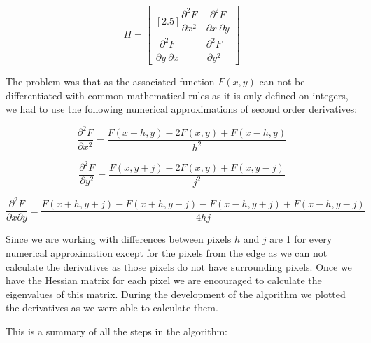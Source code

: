 \documentclass{article}
\begin{document}
\begin{equation}
    H =
    \begin{bmatrix}[2.5]
        \dfrac{\partial^{2} F}{\partial x^{2}} & \dfrac{\partial^{2} F}{\partial x \ \partial y} \\
        \dfrac{\partial^{2} F}{\partial y \ \partial x} & \dfrac{\partial^{2} F}{\partial y^{2}}  
    \end{bmatrix}
\end{equation}

The problem was that as the associated function $F(x,y)$ can not be differentiated with common mathematical rules as it is only defined on integers, we had to use the following numerical approximations of second order derivatives:

\begin{equation}
    \dfrac{\partial^{2} F}{\partial x^{2}} = \dfrac{F(x+h,y) - 2F(x,y) + F(x-h,y)}{h^{2}}
    \label{DerivativeXX}
\end{equation}

\begin{equation}
    \dfrac{\partial^{2} F}{\partial y^{2}} = \dfrac{F(x,y+j) - 2F(x,y) + F(x,y-j)}{j^{2}}
\end{equation}

\begin{equation}
    \frac{\partial^{2} F}{\partial x \partial y} = \dfrac{F(x+h,y+j)-F(x+h,y-j)-F(x-h,y+j)+F(x-h,y-j)}{4hj}
    \label{DerivativeXY}
\end{equation}

Since we are working with differences between pixels $h$ and $j$ are 1 for every numerical approximation except for the pixels from the edge as we can not calculate the derivatives as those pixels do not have surrounding pixels. Once we have the Hessian matrix for each pixel we are encouraged to calculate the eigenvalues of this matrix. During the development of the algorithm we plotted the derivatives as we were able to calculate them.

This is a summary of all the steps in the algorithm:
\end{document}
